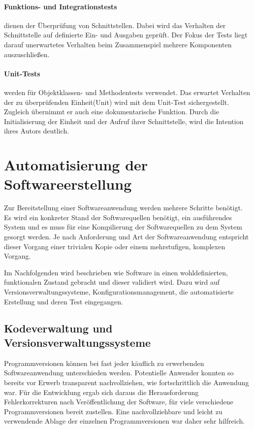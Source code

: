 \paragraph{Funktions- und Integrationstests}

dienen der Überprüfung von Schnittstellen. Dabei wird das Verhalten der Schnittstelle auf definierte Ein- und Ausgaben geprüft. Der Fokus der Tests liegt darauf unerwartetes Verhalten beim Zusammenspiel mehrere Komponenten auszuschließen.

\paragraph{Unit-Tests}

werden für Objektklassen- und Methodentests verwendet. Das erwartet Verhalten der zu überprüfenden Einheit(Unit) wird mit dem Unit-Test sichergestellt. Zugleich übernimmt er auch eine dokumentarische Funktion. Durch die Initialisierung der Einheit und der Aufruf ihrer Schnittstelle, wird die Intention ihres Autors deutlich.

\section{Automatisierung der Softwareerstellung}

Zur Bereitstellung einer Softwareanwendung werden mehrere Schritte benötigt. Es wird ein konkreter Stand der Softwarequellen benötigt, ein ausführendes System und es muss für eine Kompilierung der Softwarequellen zu dem System gesorgt werden.
Je nach Anforderung und Art der Softwareanwendung entspricht dieser Vorgang einer trivialen Kopie oder einem mehrstufigen, komplexen Vorgang. 

Im Nachfolgenden wird beschrieben wie Software in einen wohldefinierten, funktionalen Zustand gebracht und dieser validiert wird. Dazu wird auf Versionsverwaltungssysteme, Konfigurationsmanagement, die automatisierte Erstellung und deren Test eingegangen.

\subsection{Kodeverwaltung und Versionsverwaltungssysteme}

Programmversionen können bei fast jeder käuflich zu erwerbenden Softwareanwendung unterschieden werden. Potentielle 
Anwender konnten so bereits vor Erwerb transparent nachvollziehen, wie fortschrittlich die Anwendung war.
Für die Entwicklung ergab sich daraus die Herausforderung Fehlerkorrekturen nach Veröffentlichung der Software, für viele 
verschiedene Programmversionen bereit zustellen.
Eine nachvollziehbare und leicht zu verwendende Ablage der einzelnen Programmversionen war daher sehr hilfreich.

